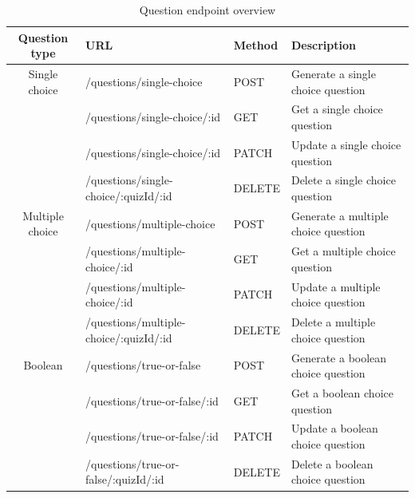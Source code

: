 \begin{table}[H]
    \begin{tabular}{|c|p{5cm}|l|p{5.5cm}|}
        \hline
        \textbf{Question type} & \textbf{URL} & \textbf{Method} & \textbf{Description} \\
        \hline
        Single choice & /questions/single-choice & POST & Generate a single choice question \\
        & /questions/single-choice/:id & GET & Get a single choice question \\
        & /questions/single-choice/:id & PATCH & Update a single choice question \\
        & /questions/single-choice/:quizId/:id & DELETE & Delete a single choice question \\
        \hline
        Multiple choice & /questions/multiple-choice & POST & Generate a multiple choice question \\
        & /questions/multiple-choice/:id & GET & Get a multiple choice question \\
        & /questions/multiple-choice/:id & PATCH & Update a multiple choice question \\
        & /questions/multiple-choice/:quizId/:id & DELETE & Delete a multiple choice question \\
        \hline
        Boolean & /questions/true-or-false & POST & Generate a boolean choice question \\
        & /questions/true-or-false/:id & GET & Get a boolean choice question \\
        & /questions/true-or-false/:id & PATCH & Update a boolean choice question \\
        & /questions/true-or-false/:quizId/:id & DELETE & Delete a boolean choice question \\
        \hline
    \end{tabular}
    \caption{Question endpoint overview}
    \label{tab:question-endpoints}
\end{table}

